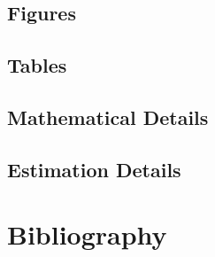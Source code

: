 \documentclass[12pt]{report}
\begin{document}
\clearpage
\begin{subappendices}
\section{Figures}\label{app:dsc-figures}


\clearpage
\section{Tables}\label{app:dsc-tables}


\clearpage
\section{Mathematical Details}\label{app:dsc-math}


\clearpage
\section{Estimation Details}\label{app:dsc-estimation}


\end{subappendices}


% 

%
%
%
%
%
%
\clearpage
\chapter*{Bibliography}

\begin{singlespace}

  \setlength{}

  \raggedright
  \printbibliography[
    heading = none
  ]
\end{singlespace}
\end{document}
